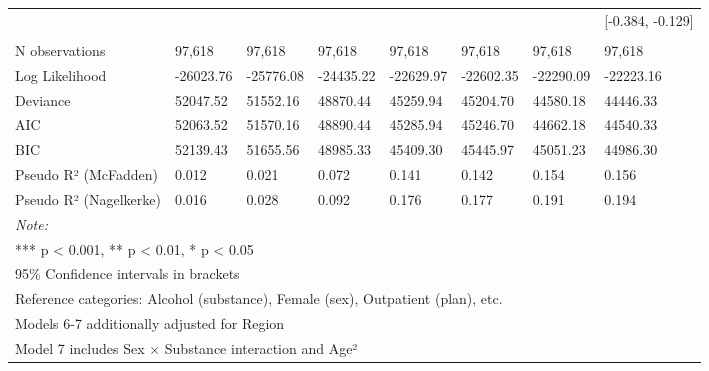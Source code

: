 \documentclass[
  spanish,
  10pt,
]{article}
\begin{document}
\begin{table}[H]
{\begin{tabular}[t]{llllllll}
 &  &  &  &  &  &  & {}[-0.384, -0.129]\\
\addlinespace[0.3em]
\multicolumn{8}{l}{\textbf{Model statistics}}\\
\hspace{1em}N observations & 97,618 & 97,618 & 97,618 & 97,618 & 97,618 & 97,618 & 97,618\\
\hspace{1em}Log Likelihood & -26023.76 & -25776.08 & -24435.22 & -22629.97 & -22602.35 & -22290.09 & -22223.16\\
\hspace{1em}Deviance & 52047.52 & 51552.16 & 48870.44 & 45259.94 & 45204.70 & 44580.18 & 44446.33\\
\hspace{1em}AIC & 52063.52 & 51570.16 & 48890.44 & 45285.94 & 45246.70 & 44662.18 & 44540.33\\
\hspace{1em}BIC & 52139.43 & 51655.56 & 48985.33 & 45409.30 & 45445.97 & 45051.23 & 44986.30\\
\hspace{1em}Pseudo R² (McFadden) & 0.012 & 0.021 & 0.072 & 0.141 & 0.142 & 0.154 & 0.156\\
\hspace{1em}Pseudo R² (Nagelkerke) & 0.016 & 0.028 & 0.092 & 0.176 & 0.177 & 0.191 & 0.194\\
\bottomrule
\multicolumn{8}{l}{\rule{0pt}{1em}\textit{Note: }}\\
\multicolumn{8}{l}{\rule{0pt}{1em}*** p < 0.001, ** p < 0.01, * p < 0.05}\\
\multicolumn{8}{l}{\rule{0pt}{1em}95\% Confidence intervals in brackets}\\
\multicolumn{8}{l}{\rule{0pt}{1em}Reference categories: Alcohol (substance), Female (sex), Outpatient (plan), etc.}\\
\multicolumn{8}{l}{\rule{0pt}{1em}Models 6-7 additionally adjusted for Region}\\
\multicolumn{8}{l}{\rule{0pt}{1em}Model 7 includes Sex × Substance interaction and Age²}\\
\end{tabular}}
\end{table}
\end{document}
